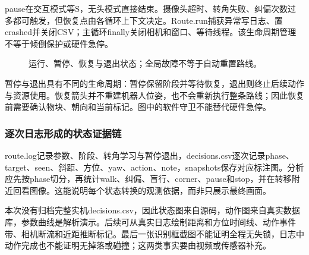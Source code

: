 pause在交互模式等S，无头模式直接结束。摄像头超时、转角失败、纠偏次数过多都可触发，但恢复点由各循环上下文决定。Route.run捕获异常写日志、置crashed并关闭CSV；主循环finally关闭相机和窗口、等待线程。该生命周期管理不等于倾倒保护或硬件急停。
\begin{figure}[H]\centering\caption{运行、暂停、恢复与退出状态；全局故障不等于自动重置路线。}\end{figure}

暂停与退出具有不同的生命周期：暂停保留阶段并等待恢复，退出则终止后续动作与资源使用。恢复箭头并不重建机器人位姿，也不会重新执行整条路线；因此恢复前需要确认物块、朝向和当前标记。图中的软件守卫不能替代硬件急停。


\subsubsection{逐次日志形成的状态证据链}
route.log记录参数、阶段、转角学习与暂停退出，decisions.csv逐次记录phase、target、seen、斜距、方位、yaw、action、note，snapshots保存对应标注图。分析应先按phase切分，再统计walk、纠偏、盲行、corner、pause和stop，并在转移附近回看图像。这能说明每个状态转换的观测依据，而非只展示最终画面。

本次没有归档完整实机decisions.csv，因此状态图来自源码，动作图来自真实数据库，参数曲线是解析演示。后续可从真实日志绘制距离和方位时间线、动作事件带、相机断流和近距推断标记。最后一张识别框截图不能证明全程无失锁，日志中动作完成也不能证明无掉落或碰撞；这两类事实要由视频或传感器补充。
